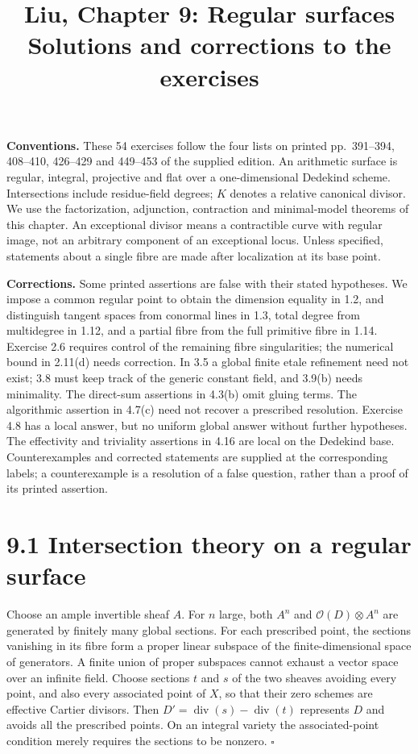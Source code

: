 \documentclass[11pt]{article}
\title{Liu, Chapter 9: Regular surfaces\\[2pt]\large Solutions and corrections to the exercises}
\author{}\date{}
\let\chapterexercise\exercise
\renewcommand{\exercise}[2]{\Needspace{8\baselineskip}\chapterexercise{#1}{#2}}
\begin{document}
\maketitle
\textbf{Conventions.} These 54 exercises follow the four lists on printed pp.~391--394, 408--410, 426--429 and 449--453 of the supplied edition. An arithmetic surface is regular, integral, projective and flat over a one-dimensional Dedekind scheme. Intersections include residue-field degrees; $K$ denotes a relative canonical divisor. We use the factorization, adjunction, contraction and minimal-model theorems of this chapter. An exceptional divisor means a contractible curve with regular image, not an arbitrary component of an exceptional locus. Unless specified, statements about a single fibre are made after localization at its base point.

\textbf{Corrections.} Some printed assertions are false with their stated hypotheses. We impose a common regular point to obtain the dimension equality in 1.2, and distinguish tangent spaces from conormal lines in 1.3, total degree from multidegree in 1.12, and a partial fibre from the full primitive fibre in 1.14. Exercise 2.6 requires control of the remaining fibre singularities; the numerical bound in 2.11(d) needs correction. In 3.5 a global finite etale refinement need not exist; 3.8 must keep track of the generic constant field, and 3.9(b) needs minimality. The direct-sum assertions in 4.3(b) omit gluing terms. The algorithmic assertion in 4.7(c) need not recover a prescribed resolution. Exercise 4.8 has a local answer, but no uniform global answer without further hypotheses. The effectivity and triviality assertions in 4.16 are local on the Dedekind base. Counterexamples and corrected statements are supplied at the corresponding labels; a counterexample is a resolution of a false question, rather than a proof of its printed assertion.

\section*{9.1 Intersection theory on a regular surface}

\pf Choose an ample invertible sheaf $A$. For $n$ large, both $A^n$ and $\mathcal O(D)\otimes A^n$ are generated by finitely many global sections. For each prescribed point, the sections vanishing in its fibre form a proper linear subspace of the finite-dimensional space of generators. A finite union of proper subspaces cannot exhaust a vector space over an infinite field. Choose sections $t$ and $s$ of the two sheaves avoiding every point, and also every associated point of $X$, so that their zero schemes are effective Cartier divisors. Then $D'=\operatorname{div}(s)-\operatorname{div}(t)$ represents $D$ and avoids all the prescribed points. On an integral variety the associated-point condition merely requires the sections to be nonzero. \hfill$\square$
\end{document}
